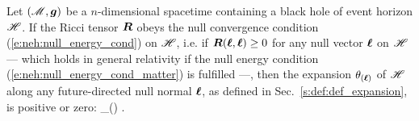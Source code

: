 \begin{prop}
\label{p:evo:positive_expansion}
Let $(\mathscr{M},\bm{g})$ be a $n$-dimensional spacetime containing a black hole
of event horizon $\mathscr{H}$. If the Ricci tensor $\bm{R}$ obeys the null
convergence condition (\ref{e:neh:null_energy_cond}) on $\mathscr{H}$, i.e. if
$\bm{R}(\bm{\ell}, \bm{\ell}) \geq 0$ for any null vector $\bm{\ell}$ on $\mathscr{H}$
--- which holds in general relativity if the null energy condition (\ref{e:neh:null_energy_cond_matter}) is fulfilled ---, then the
expansion $\theta_{(\bm{\ell})}$ of $\mathscr{H}$ along any future-directed null
normal $\bm{\ell}$, as defined in Sec.~\ref{s:def:def_expansion}, is positive or zero:
\be \label{e:evo:theta_positive}
    \theta_{(\wl)}  .
\ee
\end{prop}
